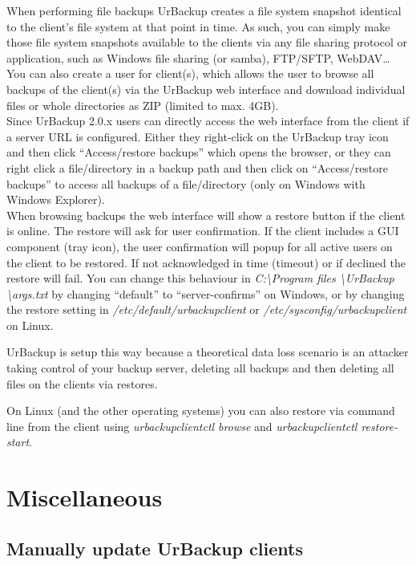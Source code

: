 \documentclass[a4paper,10pt]{article}
\begin{document}
When performing file backups UrBackup creates a file system snapshot identical to the client's file system at that point in time. As such, you can simply make those file system snapshots available to the clients via any file sharing protocol or application, such as Windows file sharing (or samba), FTP/SFTP, WebDAV\ldots\\

You can also create a user for client(s), which allows the user to browse all backups of the client(s) via the UrBackup web interface and download individual files or whole directories as ZIP (limited to max. 4GB).\\

Since UrBackup 2.0.x users can directly access the web interface from the client if a server URL is configured. Either they right-click on the UrBackup tray icon and then click ``Access/restore backups'' which opens the browser, or they can right click a file/directory in a backup path and then click on ``Access/restore backups'' to access all backups of a file/directory (only on Windows with Windows Explorer).\\

When browsing backups the web interface will show a restore button if the client is online. The restore will ask for user confirmation. If the client includes a GUI component (tray icon), the user confirmation will popup for all active users on the client to be restored. If not acknowledged in time (timeout) or if declined the restore will fail. 
You can change this behaviour in \textsl{C:\textbackslash Program files \textbackslash UrBackup \textbackslash args.txt} by changing ``default'' to ``server-confirms'' on Windows, or by changing the restore setting in \textsl{/etc/default/urbackupclient} or \textsl{/etc/sysconfig/urbackupclient} on Linux.

UrBackup is setup this way because a theoretical data loss scenario is an attacker taking control of your backup server, deleting all backups and then deleting all files on the clients via restores.  

On Linux (and the other operating systems) you can also restore via command line from the client using \textsl{urbackupclientctl browse} and \textsl{urbackupclientctl restore-start}.

\section{Miscellaneous}

\subsection{Manually update UrBackup clients}
\label{subsec:manually_update_client}
\end{document}
